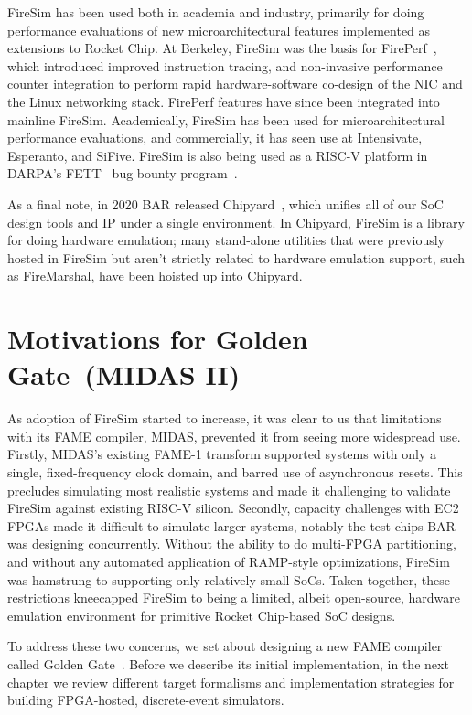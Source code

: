 FireSim has been used both in academia and industry, primarily for doing
performance evaluations of new microarchitectural features implemented as
extensions to Rocket Chip.  At Berkeley, FireSim was the basis for
FirePerf~\cite{FirePerf}, which introduced improved instruction tracing, and
non-invasive performance counter integration to perform rapid hardware-software co-design of the NIC
and the Linux networking stack. FirePerf features have since been integrated into
mainline FireSim. Academically, FireSim has been used for microarchitectural performance evaluations,
and commercially, it has seen use at Intensivate, Esperanto, and SiFive. FireSim is also being used as a RISC-V platform in DARPA's
FETT~\cite{FETT} bug bounty program~\cite{FireSimFETT}.

As a final note, in 2020 BAR released Chipyard~\cite{Chipyard}, which unifies all of
our SoC design tools and IP under a single environment. In Chipyard,
FireSim is a library for doing hardware emulation; many stand-alone utilities
that were previously hosted in FireSim but aren't strictly related to hardware emulation
support, such as FireMarshal, have been hoisted up into Chipyard.

\section{Motivations for Golden Gate~(MIDAS II)}

As adoption of FireSim started to increase, it was clear to us that limitations with
its FAME compiler, MIDAS, prevented it from seeing more widespread use. Firstly, MIDAS's existing FAME-1
transform supported systems with only a single, fixed-frequency clock domain,
and barred use of asynchronous resets. This precludes
simulating most realistic systems and made it challenging to validate FireSim
against existing RISC-V silicon. Secondly, capacity challenges with EC2
FPGAs made it difficult to simulate larger systems, notably the test-chips
BAR was designing concurrently. Without the ability to do multi-FPGA
partitioning, and without any automated application of RAMP-style
optimizations, FireSim was hamstrung to supporting only relatively small
SoCs. Taken together, these restrictions kneecapped FireSim to being a limited, albeit
open-source, hardware emulation environment for primitive Rocket Chip-based SoC designs.

To address these two concerns, we set about designing a new FAME compiler
called Golden Gate~\cite{GoldenGate}. Before we describe its initial
implementation, in the next chapter we review different target formalisms and
implementation strategies for building FPGA-hosted, discrete-event simulators.
